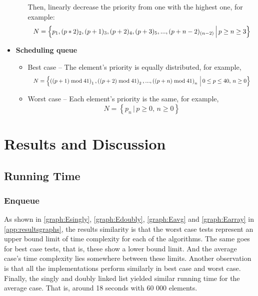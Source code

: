 \documentclass[a4paper,11pt]{kth-mag}
\begin{document}
\begin{itemize}
\begin{itemize}
                Then, linearly decrease the priority from one with the highest one, for example:
                \begin{equation*}
                    \resizebox{.9\hsize}{!}{$N = \left\{p_1, (p*2)_2, (p+1)_3, (p+2)_4, (p+3)_5,..., (p+n-2)_{(n-2)} \, \Big| \, p \ge n \ge 3 \right\}$}
                \end{equation*}
        \end{itemize}
    \item \textbf{Scheduling queue}
        \begin{itemize}
            \item Best case -- The element's priority is equally distributed, for example,
                \begin{equation*}
                    \resizebox{.9\hsize}{!}{$N = \left\{\left((p+1) \bmod 41\right)_1, \left((p+2) \bmod 41\right)_2,..., \left((p+n) \bmod 41\right)_n \, \Big| \, 0 \le p \le 40, \, n \ge 0\right\}$}
                \end{equation*}
            \item Worst case -- Each element's priority is the same, for example,
                \begin{equation*}
                    N = \left\{p_{n} \, \Big| \, p \ge 0,\, n \ge 0 \right\}
                \end{equation*}
        \end{itemize}
\end{itemize}


\chapter{Results and Discussion}

\section{Running Time}
\subsection{Enqueue}
As shown in \cref{graph:Esingly}, \cref{graph:Edoubly}, \cref{graph:Eavg} and \cref{graph:Earray} in \cref{app:resultsgraphs}, the results similarity is that the worst case tests represent an upper bound limit of time complexity for each of the algorithms.
The same goes for best case tests, that is, these show a lower bound limit.
And the average case's time complexity lies somewhere between these limits.
Another observation is that all the implementations perform similarly in best case and worst case.
Finally, the singly and doubly linked list yielded similar running time for the average case.
That is, around 18 seconds with 60 000 elements.
\end{document}
